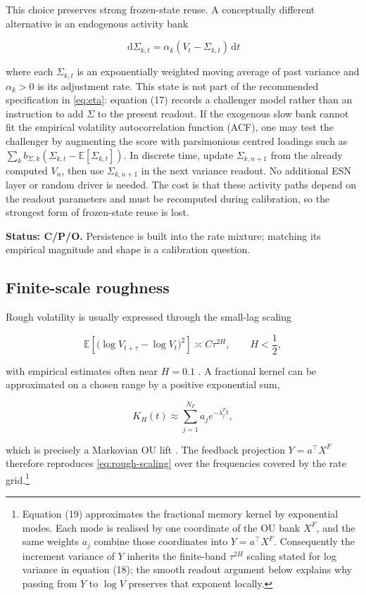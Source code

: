 \documentclass[11pt,a4paper]{article}
\newcommand{\E}{\mathbb{E}}
\newcommand{\dd}{\,\mathrm{d}}
\begin{document}
This choice preserves strong frozen-state reuse.  A conceptually different alternative is an
endogenous activity bank

\begin{equation}
\dd\Sigma_{k,t}=\alpha_k(V_t-\Sigma_{k,t})\dd t
\end{equation}

where each \(\Sigma_{k,t}\) is an exponentially weighted moving average of past variance and
\(\alpha_k>0\) is its adjustment rate.  This state is not part of the recommended specification
in \cref{eq:eta}: equation (17) records a challenger model rather than an instruction to add
\(\Sigma\) to the present readout.  If the exogenous slow bank cannot fit the empirical
volatility autocorrelation function (ACF), one may test the challenger by augmenting the score
with parsimonious centred loadings such as
\(\sum_k b_{\Sigma,k}(\Sigma_{k,t}-\E[\Sigma_{k,t}])\).  In discrete time, update
\(\Sigma_{k,n+1}\) from the already computed \(V_n\), then use \(\Sigma_{k,n+1}\) in the next
variance readout.  No additional ESN layer or random driver is needed.  The cost is that these
activity paths depend on the readout parameters and must be recomputed during calibration, so
the strongest form of frozen-state reuse is lost.

\textbf{Status: C/P/O.} Persistence is built into the rate mixture; matching its empirical
magnitude and shape is a calibration question.

\subsection{Finite-scale roughness}

Rough volatility is usually expressed through the small-lag scaling

\begin{equation}
\E\!\left[\bigl(\log V_{t+\tau}-\log V_t\bigr)^2\right]
\asymp C\tau^{2H},\qquad H<\frac12,
\label{eq:rough-scaling}
\end{equation}

with empirical estimates often near \(H=0.1\) \cite{gatheral2018}. A fractional kernel can be
approximated on a chosen range by a positive exponential sum,

\begin{equation}
K_H(t)\approx\sum_{j=1}^{N_F}a_je^{-\lambda_j^F t},
\label{eq:kernel-lift}
\end{equation}

which is precisely a Markovian OU lift \cite{abijaber2019}. The feedback projection
\(Y=a^\top X^F\) therefore reproduces \cref{eq:rough-scaling} over the frequencies covered by
the rate grid.\footnote{Equation (19) approximates the fractional memory kernel by exponential
modes.  Each mode is realised by one coordinate of the OU bank \(X^F\), and the same weights
\(a_j\) combine those coordinates into \(Y=a^\top X^F\).  Consequently the increment variance
of \(Y\) inherits the finite-band \(\tau^{2H}\) scaling stated for log variance in equation
(18); the smooth readout argument below explains why passing from \(Y\) to \(\log V\) preserves
that exponent locally.}
\end{document}
